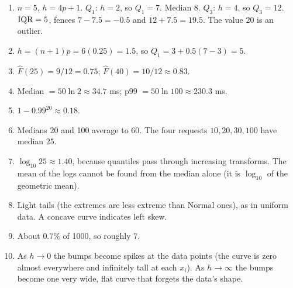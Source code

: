 \begin{enumerate}
  \item $n=5$, $h = 4p + 1$. $Q_1$: $h=2$, so $Q_1 = 7$. Median $8$. $Q_3$: $h = 4$, so
  $Q_3 = 12$. $\operatorname{IQR} = 5$, fences $7 - 7.5 = -0.5$ and $12 + 7.5 = 19.5$. The value $20$ is
  an outlier.
  \item $h = (n+1)p = 6(0.25) = 1.5$, so $Q_1 = 3 + 0.5(7 - 3) = 5$.
  \item $\hat F(25) = 9/12 = 0.75$; $\hat F(40) = 10/12 \approx 0.83$.
  \item Median $= 50\ln 2 \approx 34.7$ ms; p99 $= 50\ln 100 \approx 230.3$ ms.
  \item $1 - 0.99^{20} \approx 0.18$.
  \item Medians 20 and 100 average to 60. The four requests $10, 20, 30, 100$ have median
  $25$.
  \item $\log_{10} 25 \approx 1.40$, because quantiles pass through increasing transforms.
  The mean of the logs cannot be found from the median alone (it is $\log_{10}$ of the
  geometric mean).
  \item Light tails (the extremes are less extreme than Normal ones), as in uniform data.
  A concave curve indicates left skew.
  \item About $0.7\%$ of 1000, so roughly 7.
  \item As $h \to 0$ the bumps become spikes at the data points (the curve is zero almost
  everywhere and infinitely tall at each $x_i$). As $h \to \infty$ the bumps become one
  very wide, flat curve that forgets the data's shape.
\end{enumerate}
